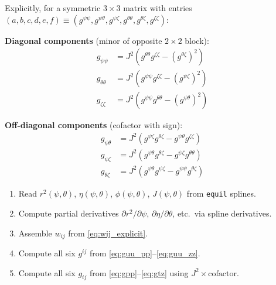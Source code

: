 \documentclass[12pt,a4paper]{article}
\begin{document}
Explicitly, for a symmetric $3\times3$ matrix with entries $(a,b,c,d,e,f) \equiv (g^{\psi\psi}, g^{\psi\theta}, g^{\psi\zeta}, g^{\theta\theta}, g^{\theta\zeta}, g^{\zeta\zeta})$:

\noindent\textbf{Diagonal components} (minor of opposite $2\times2$ block):
\begin{align}
    g_{\psi\psi} &= J^2\!\left(g^{\theta\theta}g^{\zeta\zeta} - (g^{\theta\zeta})^2\right) \label{eq:gpp}\\
    g_{\theta\theta} &= J^2\!\left(g^{\psi\psi}g^{\zeta\zeta} - (g^{\psi\zeta})^2\right) \label{eq:gtt}\\
    g_{\zeta\zeta} &= J^2\!\left(g^{\psi\psi}g^{\theta\theta} - (g^{\psi\theta})^2\right) \label{eq:gzz}
\end{align}

\noindent\textbf{Off-diagonal components} (cofactor with sign):
\begin{align}
    g_{\psi\theta} &= J^2\!\left(g^{\psi\zeta}g^{\theta\zeta} - g^{\psi\theta}g^{\zeta\zeta}\right) \label{eq:gpt}\\
    g_{\psi\zeta} &= J^2\!\left(g^{\psi\theta}g^{\theta\zeta} - g^{\psi\zeta}g^{\theta\theta}\right) \label{eq:gpz}\\
    g_{\theta\zeta} &= J^2\!\left(g^{\psi\theta}g^{\psi\zeta} - g^{\psi\psi}g^{\theta\zeta}\right) \label{eq:gtz}
\end{align}

\begin{tcolorbox}[colback=gray!8!white, colframe=gray!60!black, title=\textbf{Metric computation pipeline}]
\begin{enumerate}
    \item Read $r^2(\psi,\theta)$, $\eta(\psi,\theta)$, $\phi(\psi,\theta)$, $J(\psi,\theta)$ from \texttt{equil} splines.
    \item Compute partial derivatives $\partial r^2/\partial\psi$, $\partial\eta/\partial\theta$, etc.\ via spline derivatives.
    \item Assemble $w_{ij}$ from \eqref{eq:wij_explicit}.
    \item Compute all six $g^{ij}$ from \eqref{eq:guu_pp}--\eqref{eq:guu_zz}.
    \item Compute all six $g_{ij}$ from \eqref{eq:gpp}--\eqref{eq:gtz} using $J^2\times\mathrm{cofactor}$.
\end{enumerate}
\end{tcolorbox}
\end{document}
